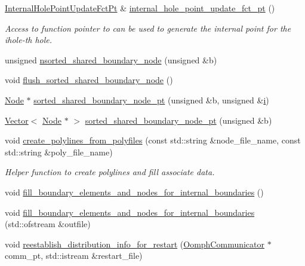 \begin{DoxyCompactItemize}
\hyperlink{classoomph_1_1RefineableTriangleMesh_aa6831f42aa1941f4ae0b9186d01f9d7c}{Internal\+Hole\+Point\+Update\+Fct\+Pt} \& \hyperlink{classoomph_1_1RefineableTriangleMesh_af6e60e92bff82e8bf26ffd170125559c}{internal\+\_\+hole\+\_\+point\+\_\+update\+\_\+fct\+\_\+pt} ()
\begin{DoxyCompactList}\small\item\em Access to function pointer to can be used to generate the internal point for the ihole-\/th hole. \end{DoxyCompactList}\item 
unsigned \hyperlink{classoomph_1_1RefineableTriangleMesh_ad75bed93a7986b69f9bf928d88af294b}{nsorted\+\_\+shared\+\_\+boundary\+\_\+node} (unsigned \&b)
\item 
void \hyperlink{classoomph_1_1RefineableTriangleMesh_ad217a5617c922036481ded0de5e40aec}{flush\+\_\+sorted\+\_\+shared\+\_\+boundary\+\_\+node} ()
\item 
\hyperlink{classoomph_1_1Node}{Node} $\ast$ \hyperlink{classoomph_1_1RefineableTriangleMesh_a83d026092113ef41bd74e4d73928ebef}{sorted\+\_\+shared\+\_\+boundary\+\_\+node\+\_\+pt} (unsigned \&b, unsigned \&\hyperlink{cfortran_8h_adb50e893b86b3e55e751a42eab3cba82}{i})
\item 
\hyperlink{classoomph_1_1Vector}{Vector}$<$ \hyperlink{classoomph_1_1Node}{Node} $\ast$ $>$ \hyperlink{classoomph_1_1RefineableTriangleMesh_a99f0a509d5e79e97129a6aa66644f0b7}{sorted\+\_\+shared\+\_\+boundary\+\_\+node\+\_\+pt} (unsigned \&b)
\item 
void \hyperlink{classoomph_1_1RefineableTriangleMesh_aeae7ba7543ed8e97d32c7c688da48521}{create\+\_\+polylines\+\_\+from\+\_\+polyfiles} (const std\+::string \&node\+\_\+file\+\_\+name, const std\+::string \&poly\+\_\+file\+\_\+name)
\begin{DoxyCompactList}\small\item\em Helper function to create polylines and fill associate data. \end{DoxyCompactList}\item 
void \hyperlink{classoomph_1_1RefineableTriangleMesh_adeac705bdac96a1fb1f9f75fb5552ef6}{fill\+\_\+boundary\+\_\+elements\+\_\+and\+\_\+nodes\+\_\+for\+\_\+internal\+\_\+boundaries} ()
\item 
void \hyperlink{classoomph_1_1RefineableTriangleMesh_a85db79355838698642937d8dd875970a}{fill\+\_\+boundary\+\_\+elements\+\_\+and\+\_\+nodes\+\_\+for\+\_\+internal\+\_\+boundaries} (std\+::ofstream \&outfile)
\item 
void \hyperlink{classoomph_1_1RefineableTriangleMesh_a3ecdb3b15c3fefbc96f407c4fdf5b155}{reestablish\+\_\+distribution\+\_\+info\+\_\+for\+\_\+restart} (\hyperlink{classoomph_1_1OomphCommunicator}{Oomph\+Communicator} $\ast$comm\+\_\+pt, std\+::istream \&restart\+\_\+file)

\end{DoxyCompactItemize}
